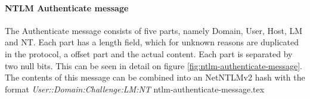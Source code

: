 \documentclass{article}
\begin{document}
\paragraph{NTLM Authenticate message}
The Authenticate message consists of five parts, namely Domain, User, Host, LM and NT. Each part has a length field, which for unknown reasons are duplicated in the protocol, a offset part and the actual content. Each part is separated by two null bits. This can be seen in detail on figure \ref{fig:ntlm-authenticate-message}. The contents of this message can be combined into an NetNTLMv2 hash with the format \emph{User::Domain:Challenge:LM:NT}
{ntlm-authenticate-message.tex}
\end{document}
